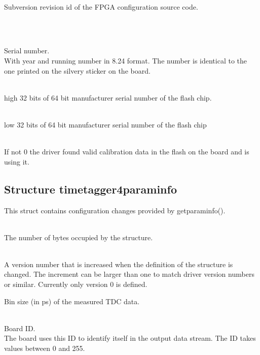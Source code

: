 			\\
			Subversion revision id of the FPGA configuration source code.

			\\
			\par

			\\
			Serial number.\\
			With year and running number in 8.24 format. The number is identical to the one printed on the silvery sticker on the board.\par

			\\
			high 32 bits of 64 bit manufacturer serial number of the flash chip.

			\\
			low 32 bits of 64 bit manufacturer serial number of the flash chip

			\\
			If not 0 the driver found valid calibration data in the flash on the board and is using it.\par

		\subsection{Structure timetagger4\tu param\tu info}
			This struct contains configuration changes provided by \textsf{\prefix get\tu param\tu info()}.

			\\
			The number of bytes occupied by the structure. \par

			\\
			A version number that is increased when the definition of the structure is changed. The increment can be larger than one to match driver version numbers or similar. Currently only version 0 is defined.\par


			Bin size (in ps) of the measured TDC data.

			\\
			Board ID.\\
			The board uses this ID to identify itself in the output data stream. The ID takes values between 0 and 255.\par

